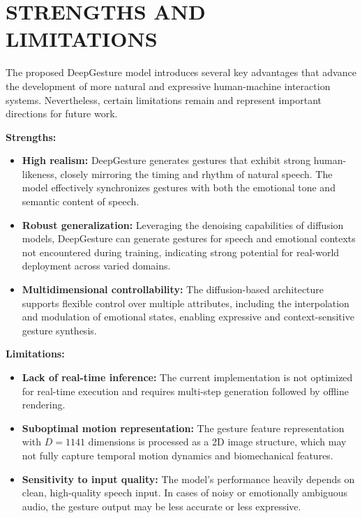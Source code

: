 \section{STRENGTHS AND LIMITATIONS}

The proposed DeepGesture model introduces several key advantages that advance the development of more natural and expressive human-machine interaction systems. Nevertheless, certain limitations remain and represent important directions for future work.

\textbf{Strengths:}

\begin{itemize}
	\item \textbf{High realism:} DeepGesture generates gestures that exhibit strong human-likeness, closely mirroring the timing and rhythm of natural speech. The model effectively synchronizes gestures with both the emotional tone and semantic content of speech.
	
	\item \textbf{Robust generalization:} Leveraging the denoising capabilities of diffusion models, DeepGesture can generate gestures for speech and emotional contexts not encountered during training, indicating strong potential for real-world deployment across varied domains.
	
	\item \textbf{Multidimensional controllability:} The diffusion-based architecture supports flexible control over multiple attributes, including the interpolation and modulation of emotional states, enabling expressive and context-sensitive gesture synthesis.
\end{itemize}

\textbf{Limitations:}

\begin{itemize}
	\item \textbf{Lack of real-time inference:} The current implementation is not optimized for real-time execution and requires multi-step generation followed by offline rendering.
	
	\item \textbf{Suboptimal motion representation:} The gesture feature representation with $D=1141$ dimensions is processed as a 2D image structure, which may not fully capture temporal motion dynamics and biomechanical features.
	
	\item \textbf{Sensitivity to input quality:} The model’s performance heavily depends on clean, high-quality speech input. In cases of noisy or emotionally ambiguous audio, the gesture output may be less accurate or less expressive.
\end{itemize}


